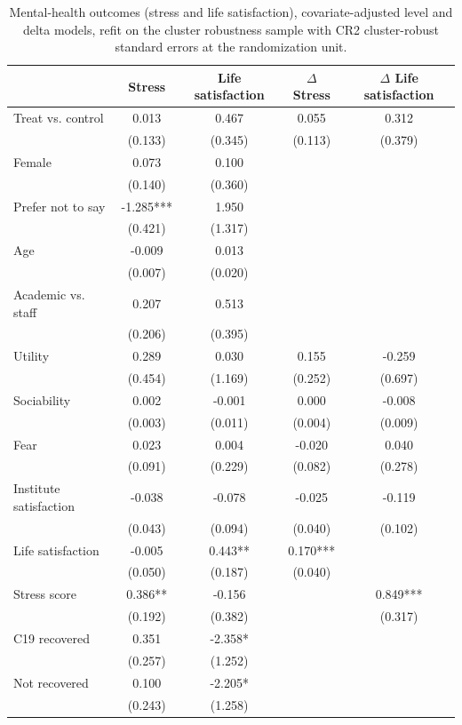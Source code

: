 \begin{table}
\centering
\caption{Mental-health outcomes (stress and life satisfaction), covariate-adjusted level and delta models, refit on the cluster robustness sample with CR2 cluster-robust standard errors at the randomization unit.\label{tab:lm-mentalhealth-cov-cluster}}
\centering
\begin{tabular}[t]{lcccc}
\toprule
  & Stress & Life satisfaction & $\Delta$ Stress & $\Delta$ Life satisfaction\\
\midrule
Treat vs. control & 0.013 & 0.467 & 0.055 & 0.312\\
 & (0.133) & (0.345) & (0.113) & (0.379)\\
Female & 0.073 & 0.100 &  & \\
 & (0.140) & (0.360) &  & \\
Prefer not to say & -1.285*** & 1.950 &  & \\
 & (0.421) & (1.317) &  & \\
Age & -0.009 & 0.013 &  & \\
 & (0.007) & (0.020) &  & \\
Academic vs. staff & 0.207 & 0.513 &  & \\
 & (0.206) & (0.395) &  & \\
Utility & 0.289 & 0.030 & 0.155 & -0.259\\
 & (0.454) & (1.169) & (0.252) & (0.697)\\
Sociability & 0.002 & -0.001 & 0.000 & -0.008\\
 & (0.003) & (0.011) & (0.004) & (0.009)\\
Fear & 0.023 & 0.004 & -0.020 & 0.040\\
 & (0.091) & (0.229) & (0.082) & (0.278)\\
Institute satisfaction & -0.038 & -0.078 & -0.025 & -0.119\\
 & (0.043) & (0.094) & (0.040) & (0.102)\\
Life satisfaction & -0.005 & 0.443** & 0.170*** & \\
 & (0.050) & (0.187) & (0.040) & \\
Stress score & 0.386** & -0.156 &  & 0.849***\\
 & (0.192) & (0.382) &  & (0.317)\\
C19 recovered & 0.351 & -2.358* &  & \\
 & (0.257) & (1.252) &  & \\
Not recovered & 0.100 & -2.205* &  & \\
 & (0.243) & (1.258) &  & \\

\end{tabular}
\end{table}
